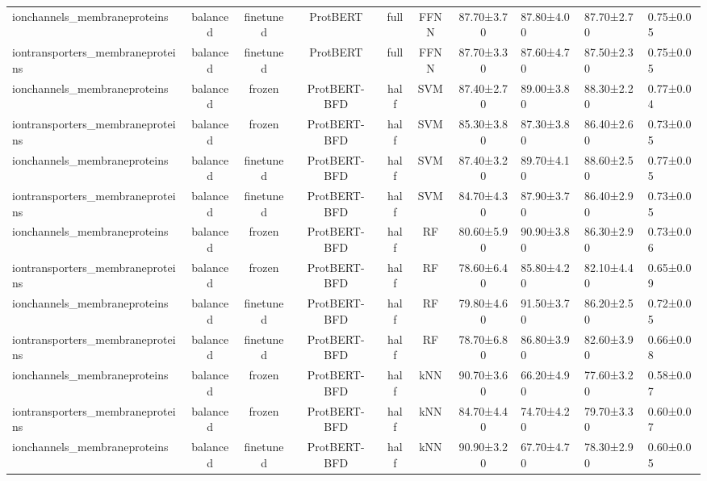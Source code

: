 \begin{tabular}{lcccccc}
    ionchannels\_membraneproteins &   balanced &      finetuned &     ProtBERT &      full &       FFNN &  87.70±3.70 &  87.80±4.00 &  87.70±2.70 & 0.75±0.05 \\
iontransporters\_membraneproteins &   balanced &      finetuned &     ProtBERT &      full &       FFNN &  87.70±3.30 &  87.60±4.70 &  87.50±2.30 & 0.75±0.05 \\
    ionchannels\_membraneproteins &   balanced &         frozen & ProtBERT-BFD &      half &        SVM &  87.40±2.70 &  89.00±3.80 &  88.30±2.20 & 0.77±0.04 \\
iontransporters\_membraneproteins &   balanced &         frozen & ProtBERT-BFD &      half &        SVM &  85.30±3.80 &  87.30±3.80 &  86.40±2.60 & 0.73±0.05 \\
    ionchannels\_membraneproteins &   balanced &      finetuned & ProtBERT-BFD &      half &        SVM &  87.40±3.20 &  89.70±4.10 &  88.60±2.50 & 0.77±0.05 \\
iontransporters\_membraneproteins &   balanced &      finetuned & ProtBERT-BFD &      half &        SVM &  84.70±4.30 &  87.90±3.70 &  86.40±2.90 & 0.73±0.05 \\
    ionchannels\_membraneproteins &   balanced &         frozen & ProtBERT-BFD &      half &         RF &  80.60±5.90 &  90.90±3.80 &  86.30±2.90 & 0.73±0.06 \\
iontransporters\_membraneproteins &   balanced &         frozen & ProtBERT-BFD &      half &         RF &  78.60±6.40 &  85.80±4.20 &  82.10±4.40 & 0.65±0.09 \\
    ionchannels\_membraneproteins &   balanced &      finetuned & ProtBERT-BFD &      half &         RF &  79.80±4.60 &  91.50±3.70 &  86.20±2.50 & 0.72±0.05 \\
iontransporters\_membraneproteins &   balanced &      finetuned & ProtBERT-BFD &      half &         RF &  78.70±6.80 &  86.80±3.90 &  82.60±3.90 & 0.66±0.08 \\
    ionchannels\_membraneproteins &   balanced &         frozen & ProtBERT-BFD &      half &        kNN &  90.70±3.60 &  66.20±4.90 &  77.60±3.20 & 0.58±0.07 \\
iontransporters\_membraneproteins &   balanced &         frozen & ProtBERT-BFD &      half &        kNN &  84.70±4.40 &  74.70±4.20 &  79.70±3.30 & 0.60±0.07 \\
    ionchannels\_membraneproteins &   balanced &      finetuned & ProtBERT-BFD &      half &        kNN &  90.90±3.20 &  67.70±4.70 &  78.30±2.90 & 0.60±0.05 \\

\end{tabular}
